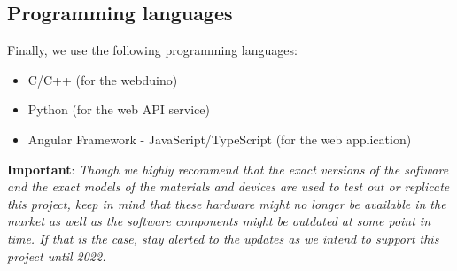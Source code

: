 \subsection{Programming languages}
Finally, we use the following programming languages:
\begin{itemize}
    \item C/C++ (for the webduino)
    \item Python (for the web API service)
    \item Angular Framework - JavaScript/TypeScript (for the web application)
\end{itemize}

\noindent
\textbf{Important}: \textit{Though we highly recommend that the exact versions of the software and the exact models of the materials and devices are used to test out or replicate this project, keep in mind that these hardware might no longer be available in the market as well as the software components might be outdated at some point in time. If that is the case, stay alerted to the updates as we intend to support this project until 2022.}

